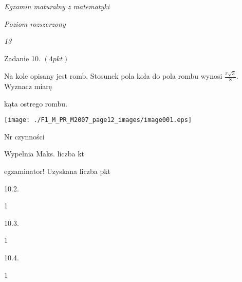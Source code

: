 \documentclass[a4paper,12pt]{article}
\begin{document}
{\it Egzamin maturalny z matematyki}

{\it Poziom rozszerzony}

{\it 13}

Zadanie 10. $(4pkt)$

Na kole opisany jest romb. Stosunek pola koła do pola rombu wynosi $\displaystyle \frac{\pi\sqrt{3}}{8}$. Wyznacz miarę

kąta ostrego rombu.
\begin{center}
\texttt{[image: ./F1\_M\_PR\_M2007\_page12\_images/image001.eps]}
\end{center}
Nr czynności

Wypelnia Maks. liczba kt

egzaminator! Uzyskana liczba pkt

10.2.

1

10.3.

1

10.4.

1
\end{document}
